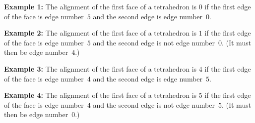 \textbf{Example 1:} The alignment of the first face of a tetrahedron
is $0$ if the first edge of the face is edge number~$5$ and the second
edge is edge number~$0$.

\textbf{Example 2:} The alignment of the first face of a tetrahedron
is $1$ if the first edge of the face is edge number~$5$ and the second
edge is not edge number~$0$. (It must then be edge number~$4$.)

\textbf{Example 3:} The alignment of the first face of a tetrahedron
is $4$ if the first edge of the face is edge number~$4$ and the second
edge is edge number~$5$.

\textbf{Example 4:} The alignment of the first face of a tetrahedron
is $5$ if the first edge of the face is edge number~$4$ and the second
edge is not edge number~$5$. (It must then be edge number~$0$.)

